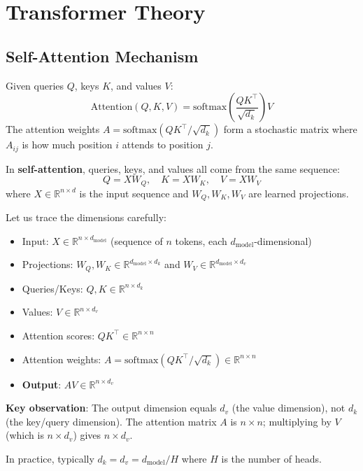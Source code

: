 \chapter{Transformer Theory}

\section{Self-Attention Mechanism}

\begin{definition}
    Given queries $Q$, keys $K$, and values $V$:
    \[
        \text{Attention}(Q, K, V) = \text{softmax}\left(\frac{QK^\top}{\sqrt{d_k}}\right) V
    \]
    The attention weights $A = \text{softmax}(QK^\top / \sqrt{d_k})$ form a stochastic matrix where $A_{ij}$ is how much position $i$ attends to position $j$.
\end{definition}

\begin{definition}
    In \textbf{self-attention}, queries, keys, and values all come from the same sequence:
    \[
        Q = XW_Q, \quad K = XW_K, \quad V = XW_V
    \]
    where $X \in \mathbb{R}^{n \times d}$ is the input sequence and $W_Q, W_K, W_V$ are learned projections.
\end{definition}

\begin{remark}
    Let us trace the dimensions carefully:
    \begin{itemize}
        \item Input: $X \in \mathbb{R}^{n \times d_{\text{model}}}$ (sequence of $n$ tokens, each $d_{\text{model}}$-dimensional)
        \item Projections: $W_Q, W_K \in \mathbb{R}^{d_{\text{model}} \times d_k}$ and $W_V \in \mathbb{R}^{d_{\text{model}} \times d_v}$
        \item Queries/Keys: $Q, K \in \mathbb{R}^{n \times d_k}$
        \item Values: $V \in \mathbb{R}^{n \times d_v}$
        \item Attention scores: $QK^\top \in \mathbb{R}^{n \times n}$
        \item Attention weights: $A = \text{softmax}(QK^\top/\sqrt{d_k}) \in \mathbb{R}^{n \times n}$
        \item \textbf{Output}: $AV \in \mathbb{R}^{n \times d_v}$
    \end{itemize}

    \textbf{Key observation}: The output dimension equals $d_v$ (the value dimension), not $d_k$ (the key/query dimension). The attention matrix $A$ is $n \times n$; multiplying by $V$ (which is $n \times d_v$) gives $n \times d_v$.

    In practice, typically $d_k = d_v = d_{\text{model}} / H$ where $H$ is the number of heads.
\end{remark}

